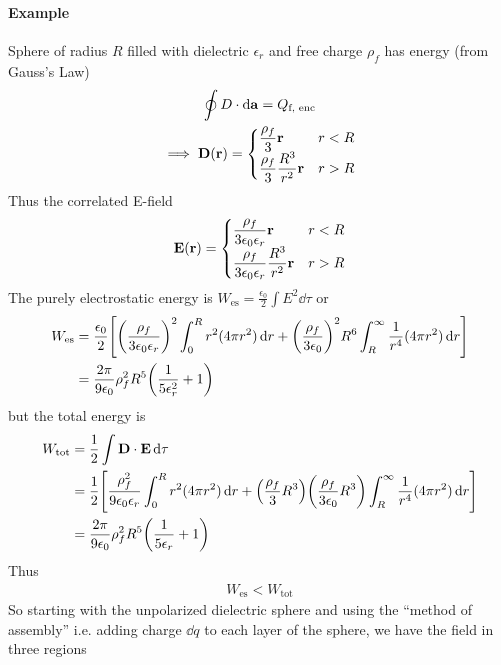 \documentclass[../main.tex]{subfiles}
\begin{document}
\paragraph{Example} Sphere of radius $R$ filled with dielectric $\epsilon_r$ and free charge $\rho_f$ has energy (from Gauss's Law)
\begin{gather*}
    \oint D \cdot \dd{\vb a} = Q_{\text{f, enc}} \\
    \implies \vb D(\vb r) = \begin{cases}
        \dfrac{\rho_f}{3} \vb r & r < R \\
        \dfrac{\rho_f}{3} \dfrac{R^3}{r^2} \vb r & r > R
    \end{cases}
\end{gather*}
Thus the correlated E-field
\begin{align*}
    \vb E (\vb r) = \begin{cases}
        \dfrac{\rho_f}{3\epsilon_0 \epsilon_r} \vb r & r < R \\
        \dfrac{\rho_f}{3\epsilon_0 \epsilon_r} \dfrac{R^3}{r^2} \vb r & r > R
    \end{cases}
\end{align*}
The purely electrostatic energy is $W_\text{es} = \frac{\epsilon_0}{2} \int E^2 \dd{\tau}$ or
\begin{align*}
    W_\text{es} &= \frac{\epsilon_0}{2} \qt[
        \qt(\frac{\rho_f}{3 \epsilon_0 \epsilon_r})^2 \int_0^R r^2 (4\pi r^2) \dd{r}
        + \qt(\frac{\rho_f}{3 \epsilon_0})^2 R^6 \int_R^\infty \frac{1}{r^4} (4\pi r^2) \dd{r} 
    ] \\
    &= \frac{2\pi}{9\epsilon_0} \rho_f^2 R^5 \qt(\frac{1}{5\epsilon_r^2} + 1)
\end{align*}
but the total energy is
\begin{align*}
    W_\text{tot} &= \frac{1}{2} \int \vb D \cdot \vb E \dd{\tau} \\
    &= \frac{1}{2} \qt[
        \frac{\rho_f^2}{9 \epsilon_0 \epsilon_r} \int_0^R r^2 (4\pi r^2) \dd{r}
        + \qt(\frac{\rho_f}{3} R^3) \qt(\frac{\rho_f}{3\epsilon_0} R^3) \int_R^\infty \frac{1}{r^4} (4\pi r^2) \dd{r}
    ] \\
    &= \frac{2\pi}{9\epsilon_0} \rho_f^2 R^5 \qt(\frac{1}{5\epsilon_r} + 1)
\end{align*}
Thus 
\begin{align*}
    W_\text{es} < W_\text{tot} 
\end{align*}
So starting with the unpolarized dielectric sphere and using the ``method of assembly'' i.e. adding charge $\dd{q}$ to each layer of the sphere, we have the field in three regions
\end{document}
